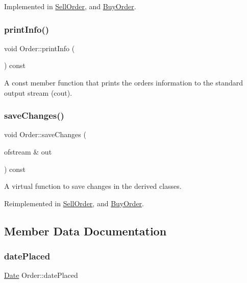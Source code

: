 Implemented in \hyperlink{class_sell_order_ae4e19807431bcd87c7126d0c644ff209}{Sell\+Order}, and \hyperlink{class_buy_order_a45641eed13ea191fff675745a618b9f5}{Buy\+Order}.

\hypertarget{class_order_a718aea4e96286f2333222d6414eaa317}{}\label{class_order_a718aea4e96286f2333222d6414eaa317} 
\subsubsection{\texorpdfstring{print\+Info()}{printInfo()}}
{\footnotesize\ttfamily void Order\+::print\+Info (\begin{DoxyParamCaption}{ }\end{DoxyParamCaption}) const}

A const member function that prints the order\textquotesingle{}s information to the standard output stream (cout). \hypertarget{class_order_a83989bde0a9b40cbeb0e87c965f6096e}{}\label{class_order_a83989bde0a9b40cbeb0e87c965f6096e} 
\subsubsection{\texorpdfstring{save\+Changes()}{saveChanges()}}
{\footnotesize\ttfamily void Order\+::save\+Changes (\begin{DoxyParamCaption}\item[{ofstream \&}]{out }\end{DoxyParamCaption}) const\hspace{0.3cm}{\ttfamily [virtual]}}

A virtual function to save changes in the derived classes. 

Reimplemented in \hyperlink{class_sell_order_a81c6ea39652c38a718803c036767787f}{Sell\+Order}, and \hyperlink{class_buy_order_aa4f087d0dbc1f6e8937c0b3679fc2f7b}{Buy\+Order}.



\subsection{Member Data Documentation}
\hypertarget{class_order_a23f58bb3f0162aac8c91a8a14136990c}{}\label{class_order_a23f58bb3f0162aac8c91a8a14136990c} 
\subsubsection{\texorpdfstring{date\+Placed}{datePlaced}}
{\footnotesize\ttfamily \hyperlink{class_date}{Date} Order\+::date\+Placed\hspace{0.3cm}{\ttfamily [protected]}}

